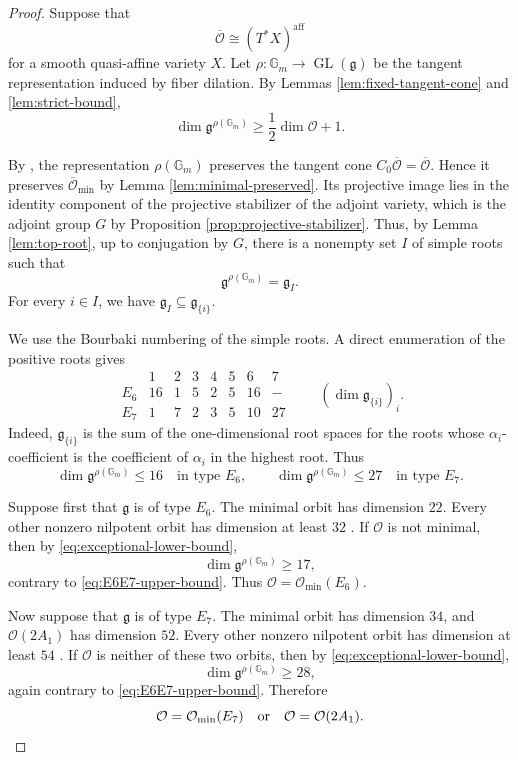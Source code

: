 \documentclass[12pt]{article}
\theoremstyle{remark}
\theoremstyle{plain}
\newcommand{\Gm}{\mathbb G_m}
\newcommand{\aff}{\mathrm{aff}}
\begin{document}
\begin{proof}
Suppose that
\[
\overline{\mathcal O}\cong(T^*X)^{\aff}
\]
for a smooth quasi-affine variety $X$. Let
$\rho:\Gm\to\operatorname{GL}(\mathfrak g)$ be the tangent
representation induced by fiber dilation. By Lemmas
\ref{lem:fixed-tangent-cone} and \ref{lem:strict-bound},
\begin{equation}\label{eq:exceptional-lower-bound}
\dim\mathfrak g^{\rho(\Gm)}
\geq\frac12\dim\mathcal O+1.
\end{equation}

By \cite[Lemma 5.2]{Jia}, the representation $\rho(\Gm)$ preserves the
tangent cone $C_0\overline{\mathcal O}=\overline{\mathcal O}$. Hence it
preserves $\overline{\mathcal O}_{\min}$ by Lemma
\ref{lem:minimal-preserved}. Its projective image lies in the identity
component of the projective stabilizer of the adjoint variety, which
is the adjoint group $G$ by Proposition
\ref{prop:projective-stabilizer}.
Thus, by Lemma \ref{lem:top-root}, up to conjugation by $G$, there
is a nonempty set $I$ of simple roots such that
\[
\mathfrak g^{\rho(\Gm)}=\mathfrak g_I.
\]
For every $i\in I$, we have
$\mathfrak g_I\subseteq\mathfrak g_{\{i\}}$.

We use the Bourbaki numbering of the simple roots. A direct enumeration
of the positive roots gives
\[
\begin{array}{c|rrrrrrr}
 &1&2&3&4&5&6&7\\
\hline
E_6&16&1&5&2&5&16&-\\
E_7&1&7&2&3&5&10&27
\end{array}
\qquad
\left(\dim\mathfrak g_{\{i\}}\right)_{i}.
\]
Indeed, $\mathfrak g_{\{i\}}$ is the sum of the one-dimensional root
spaces for the roots whose $\alpha_i$-coefficient is the coefficient
of $\alpha_i$ in the highest root. Thus
\begin{equation}\label{eq:E6E7-upper-bound}
\dim\mathfrak g^{\rho(\Gm)}\leq16
\quad\text{in type }E_6,
\qquad
\dim\mathfrak g^{\rho(\Gm)}\leq27
\quad\text{in type }E_7.
\end{equation}

Suppose first that $\mathfrak g$ is of type $E_6$. The minimal orbit
has dimension $22$. Every other nonzero nilpotent orbit has dimension
at least $32$ \cite[Section 8.4]{CM}. If $\mathcal O$ is not minimal,
then by \eqref{eq:exceptional-lower-bound},
\[
\dim\mathfrak g^{\rho(\Gm)}\geq17,
\]
contrary to \eqref{eq:E6E7-upper-bound}. Thus
$\mathcal O=\mathcal O_{\min}(E_6)$.

Now suppose that $\mathfrak g$ is of type $E_7$. The minimal orbit has
dimension $34$, and $\mathcal O(2A_1)$ has dimension $52$. Every other
nonzero nilpotent orbit has dimension at least $54$
\cite[Section 8.4]{CM}. If $\mathcal O$ is neither of these two
orbits, then by \eqref{eq:exceptional-lower-bound},
\[
\dim\mathfrak g^{\rho(\Gm)}\geq28,
\]
again contrary to \eqref{eq:E6E7-upper-bound}. Therefore
\[
\mathcal O=\mathcal O_{\min}(E_7)
\quad\text{or}\quad
\mathcal O=\mathcal O(2A_1).
\qedhere
\]
\end{proof}
\end{document}
